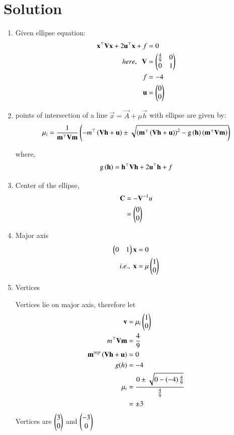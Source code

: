 \documentclass[journal,12pt,twocolumn]{IEEEtran}
\begin{document}
\section{Solution}
\begin{enumerate}

	\item Given ellipse equation:
\begin{align}
	\mathbf{x}^{\top} \mathbf{V} \mathbf{x} + 2 \mathbf{u}^{\top}\mathbf{x} +f &= 0\\
	here,\;\;
	\mathbf{V} &= \begin{pmatrix}\frac{4}{9} & 0\\0&1\end{pmatrix}\\
	f &= -4\\
	\mathbf{u} &= \begin{pmatrix}0\\0\end{pmatrix}
\end{align}

\item points of intersection of a line $\vec{x} = \vec{A}+ \mu\vec{h}$ with ellipse are given by:
\begin{multline}
	\mu_i = \frac{1}{\mathbf{m}^{\top}\mathbf{V}\mathbf{m}} \left(-m^{\top}\left(\mathbf{V}\mathbf{h}+\mathbf{u}\right) \pm \sqrt{\left(\mathbf{m}^{\top}\left(\mathbf{V}\mathbf{h}+\mathbf{u}\right)\right)^2 - \text{g}\left(\mathbf{h}\right)\left(\mathbf{m}^{\top}\mathbf{V}\mathbf{m}\right)}\right)
\end{multline}

where,
\begin{align}
	\text{g}\left(\mathbf{h}\right) = \mathbf{h}^{\top}\mathbf{V}\mathbf{h} + 2\mathbf{u}^{\top}\mathbf{h} +f
\end{align}


\item Center of the ellipse,
	\begin{align}
		\mathbf{C} &= -\mathbf{V}^{-1}u\\
			&= \begin{pmatrix}0\\0\end{pmatrix}
	\end{align}

\item Major axis
	\begin{align}
		\begin{pmatrix}0&1\end{pmatrix}\mathbf{x} &= 0\\
		i.e., \; \mathbf{x} &= \mu \begin{pmatrix}1\\0\end{pmatrix}
	\end{align}
\item Vertices

Vertices lie on major axis, therefore let
\begin{align}
	\mathbf{v} &= {\mu}_i \begin{pmatrix}1\\0\end{pmatrix}\\
	m^{\top}\mathbf{V}\mathbf{m} &= \frac{4}{9}\\
	\mathbf{m}^{top}\left(\mathbf{V}\mathbf{h}+\mathbf{u}\right) &= 0\\
	g(h) &= -4\\
	{\mu}_i &= \frac{0 \pm \sqrt{0 - \left(-4\right)\frac{4}{9}}}{\frac{4}{9}}\\
		&= \pm 3
\end{align}
Vertices are $\begin{pmatrix}3\\0\end{pmatrix}$ and $\begin{pmatrix}-3\\0\end{pmatrix}$ 


\end{enumerate}
\end{document}
